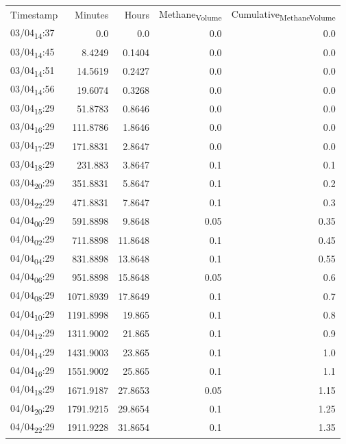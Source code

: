 \documentclass[11pt]{article}
\begin{document}
\begin{center}
\begin{tabular}{lrrrr}
Timestamp & Minutes & Hours & Methane\textsubscript{Volume} & Cumulative\textsubscript{Methane}\textsubscript{Volume}\\[0pt]
03/04\textsubscript{14}:37 & 0.0 & 0.0 & 0.0 & 0.0\\[0pt]
03/04\textsubscript{14}:45 & 8.4249 & 0.1404 & 0.0 & 0.0\\[0pt]
03/04\textsubscript{14}:51 & 14.5619 & 0.2427 & 0.0 & 0.0\\[0pt]
03/04\textsubscript{14}:56 & 19.6074 & 0.3268 & 0.0 & 0.0\\[0pt]
03/04\textsubscript{15}:29 & 51.8783 & 0.8646 & 0.0 & 0.0\\[0pt]
03/04\textsubscript{16}:29 & 111.8786 & 1.8646 & 0.0 & 0.0\\[0pt]
03/04\textsubscript{17}:29 & 171.8831 & 2.8647 & 0.0 & 0.0\\[0pt]
03/04\textsubscript{18}:29 & 231.883 & 3.8647 & 0.1 & 0.1\\[0pt]
03/04\textsubscript{20}:29 & 351.8831 & 5.8647 & 0.1 & 0.2\\[0pt]
03/04\textsubscript{22}:29 & 471.8831 & 7.8647 & 0.1 & 0.3\\[0pt]
04/04\textsubscript{00}:29 & 591.8898 & 9.8648 & 0.05 & 0.35\\[0pt]
04/04\textsubscript{02}:29 & 711.8898 & 11.8648 & 0.1 & 0.45\\[0pt]
04/04\textsubscript{04}:29 & 831.8898 & 13.8648 & 0.1 & 0.55\\[0pt]
04/04\textsubscript{06}:29 & 951.8898 & 15.8648 & 0.05 & 0.6\\[0pt]
04/04\textsubscript{08}:29 & 1071.8939 & 17.8649 & 0.1 & 0.7\\[0pt]
04/04\textsubscript{10}:29 & 1191.8998 & 19.865 & 0.1 & 0.8\\[0pt]
04/04\textsubscript{12}:29 & 1311.9002 & 21.865 & 0.1 & 0.9\\[0pt]
04/04\textsubscript{14}:29 & 1431.9003 & 23.865 & 0.1 & 1.0\\[0pt]
04/04\textsubscript{16}:29 & 1551.9002 & 25.865 & 0.1 & 1.1\\[0pt]
04/04\textsubscript{18}:29 & 1671.9187 & 27.8653 & 0.05 & 1.15\\[0pt]
04/04\textsubscript{20}:29 & 1791.9215 & 29.8654 & 0.1 & 1.25\\[0pt]
04/04\textsubscript{22}:29 & 1911.9228 & 31.8654 & 0.1 & 1.35\\[0pt]

\end{tabular}
\end{center}
\end{document}
